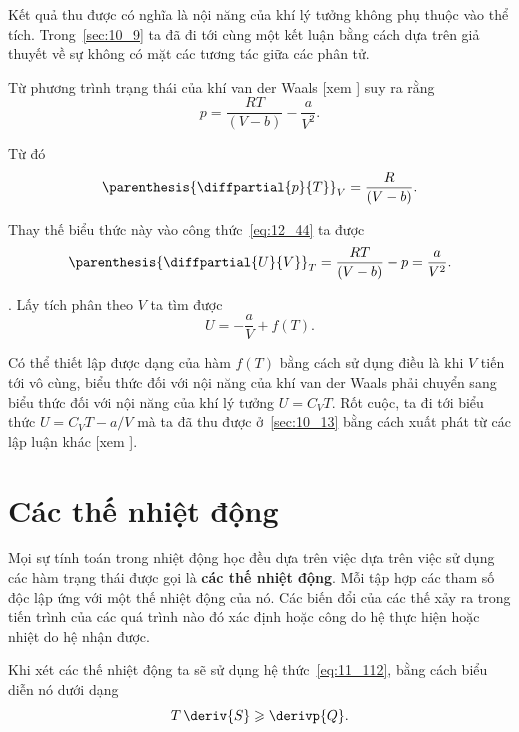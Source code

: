\noindent
Kết quả thu được có nghĩa là nội năng của khí lý tưởng không phụ thuộc vào thể tích. Trong~\ref{sec:10_9} ta đã đi tới cùng một kết luận bằng cách dựa trên giả thuyết về sự không có mặt các tương tác giữa các phân tử.

Từ phương trình trạng thái của khí van der Waals [xem ] suy ra rằng
\begin{equation}\label{eq:12_45}
	p = \frac{RT}{(V - b)} - \frac{a}{V^2}.
\end{equation}

\noindent
Từ đó
\begin{equation*}
	\parenthesis{\diffpartial{p}{T}}_V = \frac{R}{(V-b)}.
\end{equation*}

\noindent
Thay thế biểu thức này vào công thức~\eqref{eq:12_44} ta được
\begin{equation*}
	\parenthesis{\diffpartial{U}{V}}_T = \frac{RT}{(V - b)} - p = \frac{a}{V^2}.
\end{equation*}

. Lấy tích phân theo $V$ ta tìm được
\begin{equation*}
	U = -\frac{a}{V} + f(T).
\end{equation*}

\noindent
Có thể thiết lập được dạng của hàm $f(T)$ bằng cách sử dụng điều là khi $V$ tiến tới vô cùng, biểu thức đối với nội năng của khí van der Waals phải chuyển sang biểu thức đối với nội năng của khí lý tưởng $U=C_VT$. Rốt cuộc, ta đi tới biểu thức $U=C_VT-a/V$ mà ta đã thu được ở~\ref{sec:10_13} bằng cách xuất phát từ các lập luận khác [xem ].

\section{Các thế nhiệt động}\label{sec:12_6}

Mọi sự tính toán trong nhiệt động học đều dựa trên việc dựa trên việc sử dụng các hàm trạng thái được gọi là \textbf{các thế nhiệt động}. Mỗi tập hợp các tham số độc lập ứng với một thế nhiệt động của nó. Các biến đổi của các thế xảy ra trong tiến trình của các quá trình nào đó xác định hoặc công do hệ thực hiện hoặc nhiệt do hệ nhận được.

Khi xét các thế nhiệt động ta sẽ sử dụng hệ thức~\eqref{eq:11_112}, bằng cách biểu diễn nó dưới dạng
\begin{equation}\label{eq:12_46}
	T\,\deriv{S} \geqslant \derivp{Q}.
\end{equation}

